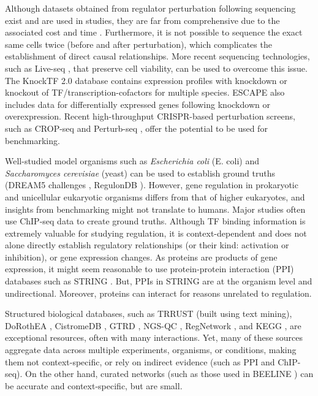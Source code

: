 Although datasets obtained from regulator perturbation following sequencing exist and are used in studies, they are far from comprehensive due to the associated cost and time \cite{olsen2014inference, frohlich2008analyzing, mccalla2023identifying}. Furthermore, it is not possible to sequence the exact same cells twice (before and after perturbation), which complicates the establishment of direct causal relationships. More recent sequencing technologies, such as Live-seq \cite{chen2022live}, that preserve cell viability, can be used to overcome this issue. The KnockTF 2.0 database \cite{feng2024knocktf} contains expression profiles with knockdown or knockout of TF/transcription-cofactors for multiple species. ESCAPE \cite{xu2013escape} also includes data for differentially expressed genes following knockdown or overexpression. Recent high-throughput CRISPR-based perturbation screens, such as CROP-seq \cite{datlinger2017pooled} and Perturb-seq \cite{dixit2016perturb}, offer the potential to be used for benchmarking. 

Well-studied model organisms such as \textit{Escherichia coli} (E. coli) and \textit{Saccharomyces cerevisiae} (yeast) can be used to establish ground truths (DREAM5 challenges \cite{marbach2012wisdom}, RegulonDB \cite{salgado2024regulondb}). However, gene regulation in prokaryotic and unicellular eukaryotic organisms differs from that of higher eukaryotes, and insights from benchmarking might not translate to humans. Major studies often use ChIP-seq data to create ground truths. Although TF binding information is extremely valuable for studying regulation, it is context-dependent and does not alone directly establish regulatory relationships (or their kind: activation or inhibition),  or gene expression changes. As proteins are products of gene expression, it might seem reasonable to use protein-protein interaction (PPI) databases such as STRING \cite{mering2003string}. But, PPIs in STRING are at the organism level and undirectional. Moreover, proteins can interact for reasons unrelated to regulation.

Structured biological databases, such as TRRUST \cite{han2018trrust} (built using text mining), DoRothEA \cite{garcia2019benchmark}, CistromeDB \cite{zheng2019cistrome}, GTRD \cite{yevshin2019gtrd}, NGS-QC \cite{mendoza2013quality}, RegNetwork \cite{liu2015regnetwork}, and KEGG \cite{kanehisa2000kegg}, are exceptional resources, often with many interactions. Yet, many of these sources aggregate data across multiple experiments, organisms, or conditions, making them not context-specific, or rely on indirect evidence (such as PPI and ChIP-seq). On the other hand, curated networks (such as those used in BEELINE \cite{pratapa2020benchmarking}) can be accurate and context-specific, but are small. 

